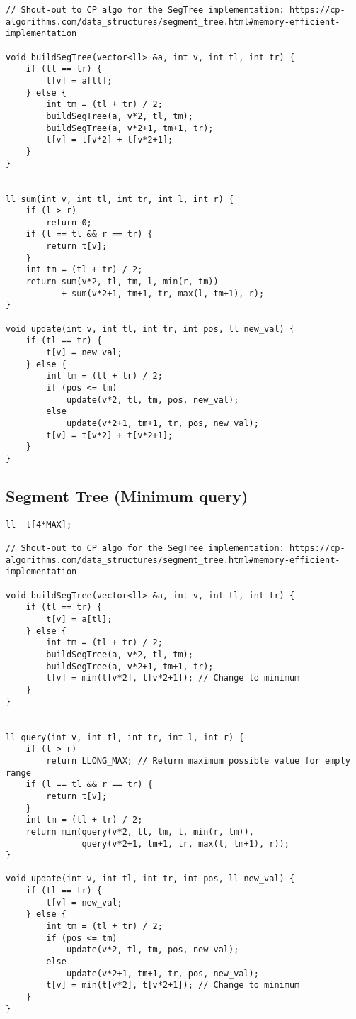 \documentclass[10pt]{article}
\begin{document}
\begin{multicols*}{2}
\begin{lstlisting}[style=compactcpp]
// Shout-out to CP algo for the SegTree implementation: https://cp-algorithms.com/data_structures/segment_tree.html#memory-efficient-implementation
 
void buildSegTree(vector<ll> &a, int v, int tl, int tr) {
    if (tl == tr) {
        t[v] = a[tl];
    } else {
        int tm = (tl + tr) / 2;
        buildSegTree(a, v*2, tl, tm);
        buildSegTree(a, v*2+1, tm+1, tr);
        t[v] = t[v*2] + t[v*2+1];
    }
}
 
 
ll sum(int v, int tl, int tr, int l, int r) {
    if (l > r) 
        return 0;
    if (l == tl && r == tr) {
        return t[v];
    }
    int tm = (tl + tr) / 2;
    return sum(v*2, tl, tm, l, min(r, tm))
           + sum(v*2+1, tm+1, tr, max(l, tm+1), r);
}
 
void update(int v, int tl, int tr, int pos, ll new_val) {
    if (tl == tr) {
        t[v] = new_val;
    } else {
        int tm = (tl + tr) / 2;
        if (pos <= tm)
            update(v*2, tl, tm, pos, new_val);
        else
            update(v*2+1, tm+1, tr, pos, new_val);
        t[v] = t[v*2] + t[v*2+1];
    }
}
\end{lstlisting}

\subsection{Segment Tree (Minimum query)}

\begin{lstlisting}[style=compactcpp]
ll  t[4*MAX];
 
// Shout-out to CP algo for the SegTree implementation: https://cp-algorithms.com/data_structures/segment_tree.html#memory-efficient-implementation
 
void buildSegTree(vector<ll> &a, int v, int tl, int tr) {
    if (tl == tr) {
        t[v] = a[tl];
    } else {
        int tm = (tl + tr) / 2;
        buildSegTree(a, v*2, tl, tm);
        buildSegTree(a, v*2+1, tm+1, tr);
        t[v] = min(t[v*2], t[v*2+1]); // Change to minimum
    }
}
 
 
ll query(int v, int tl, int tr, int l, int r) {
    if (l > r) 
        return LLONG_MAX; // Return maximum possible value for empty range
    if (l == tl && r == tr) {
        return t[v];
    }
    int tm = (tl + tr) / 2;
    return min(query(v*2, tl, tm, l, min(r, tm)),
               query(v*2+1, tm+1, tr, max(l, tm+1), r));
}
 
void update(int v, int tl, int tr, int pos, ll new_val) {
    if (tl == tr) {
        t[v] = new_val;
    } else {
        int tm = (tl + tr) / 2;
        if (pos <= tm)
            update(v*2, tl, tm, pos, new_val);
        else
            update(v*2+1, tm+1, tr, pos, new_val);
        t[v] = min(t[v*2], t[v*2+1]); // Change to minimum
    }
}
 

\end{lstlisting}
\end{multicols*}
\end{document}
